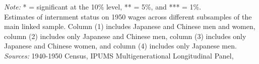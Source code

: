 \begin{table}[htbp]
   {\footnotesize
   \emph{Note:}
   * = significant at the 10\% level,
   ** = 5\%, and
   *** = 1\%. \\
   Estimates of internment status on 1950 wages 
   across different subsamples of the main linked sample. 
   Column (1) includes Japanese and Chinese men and women, 
   column (2) includes only Japanese and Chinese men, 
   column (3) includes only Japanese and Chinese women, 
   and column (4) includes only Japanese men. \\
   \emph{Sources:} 1940-1950 Census, IPUMS Multigenerational Longitudinal Panel,
   }
\end{table}